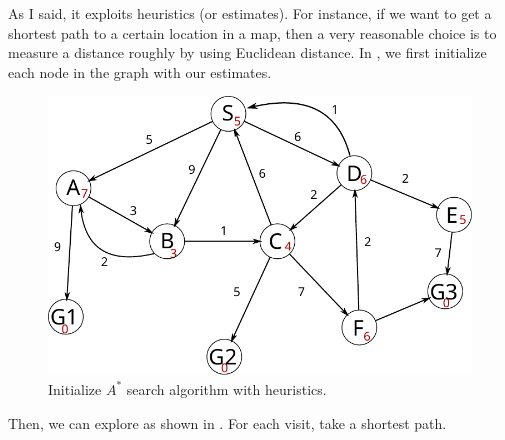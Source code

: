 As I said, it exploits heuristics (or estimates). For instance, if we want to get a shortest path to a certain location in a map, then a very reasonable choice is to measure a distance roughly by using Euclidean distance. In , we first initialize each node in the graph with our estimates. 

\begin{figure}[h]
	\centering
	\includegraphics[scale=0.73]{./images/search_alg/astar_prob.pdf}
	\caption{Initialize $A^*$ search algorithm with heuristics.}
	\label{fig:astar_start}
\end{figure}

Then, we can explore as shown in . For each visit, take a shortest path. 

